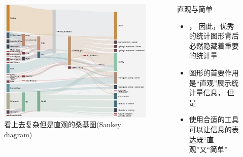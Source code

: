 \documentclass{beamerthemeMono}
\begin{document}
\begin{frame}[c]{\subsecname}
  
  \begin{columns}
    \begin{column}{.6\textwidth}
      \begin{figure}
        \centering \includegraphics[width=\columnwidth]{sankey.png}
        \caption{看上去复杂但是直观的桑基图(Sankey diagram)}
      \end{figure}
    \end{column}

    \begin{column}{.4\textwidth}
      \begin{block}{直观与简单} \small
        \begin{itemize}
        \item[\HandRight] ，
        因此，优秀的统计图形背后必然隐藏着重要的统计量
        \item[\HandRight] 图形的首要作用是“直观”展示统计量信息，
        但是
        \item[\HandRight] 使用合适的工具可以让信息的表达既“直观”又“简单” 
        \end{itemize}
      \end{block}
    \end{column}
  \end{columns}
    
\end{frame}
\end{document}
